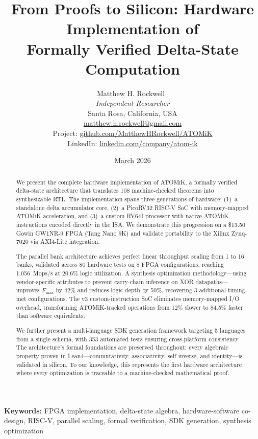 \documentclass[11pt,letterpaper]{article}
\title{From Proofs to Silicon: Hardware Implementation of\\Formally Verified Delta-State Computation}
\author{
  Matthew H. Rockwell~\orcidlink{0009-0006-6082-5583}\\
  \textit{Independent Researcher}\\
  Santa Rosa, California, USA\\
  \href{mailto:matthew.h.rockwell@gmail.com}{matthew.h.rockwell@gmail.com}\\[1em]
  \small{Project: \href{https://github.com/MatthewHRockwell/ATOMiK}{github.com/MatthewHRockwell/ATOMiK}}\\
  \small{LinkedIn: \href{https://linkedin.com/company/atom-ik}{linkedin.com/company/atom-ik}}
}
\date{March 2026}
\theoremstyle{plain}
\theoremstyle{definition}
\theoremstyle{remark}
\newcommand{\atomik}{\textsc{ATOMiK}}
\newcommand{\fmax}{$F_{\max}$}
\begin{document}
\maketitle

\begin{abstract}
We present the complete hardware implementation of \atomik{}, a formally verified delta-state architecture that translates 108 machine-checked theorems into synthesizable RTL. The implementation spans three generations of hardware: (1)~a standalone delta accumulator core, (2)~a PicoRV32 RISC-V SoC with memory-mapped \atomik{} acceleration, and (3)~a custom RV64I processor with native \atomik{} instructions encoded directly in the ISA. We demonstrate this progression on a \$13.50 Gowin GW1NR-9 FPGA (Tang Nano 9K) and validate portability to the Xilinx Zynq-7020 via AXI4-Lite integration.

The parallel bank architecture achieves perfect linear throughput scaling from 1 to 16 banks, validated across 80 hardware tests on 8 FPGA configurations, reaching 1,056~Mops/s at 20.6\% logic utilization. A synthesis optimization methodology---using vendor-specific attributes to prevent carry-chain inference on XOR datapaths---improves \fmax{} by 42\% and reduces logic depth by 50\%, recovering 3 additional timing-met configurations. The v3 custom-instruction SoC eliminates memory-mapped I/O overhead, transforming ATOMiK-tracked operations from 12\% slower to 84.5\% faster than software equivalents.

We further present a multi-language SDK generation framework targeting 5 languages from a single schema, with 353 automated tests ensuring cross-platform consistency. The architecture's formal foundations are preserved throughout: every algebraic property proven in Lean4---commutativity, associativity, self-inverse, and identity---is validated in silicon. To our knowledge, this represents the first hardware architecture where every optimization is traceable to a machine-checked mathematical proof.
\end{abstract}

\vspace{1em}
\noindent\textbf{Keywords:} FPGA implementation, delta-state algebra, hardware-software co-design, RISC-V, parallel scaling, formal verification, SDK generation, synthesis optimization
\end{document}
